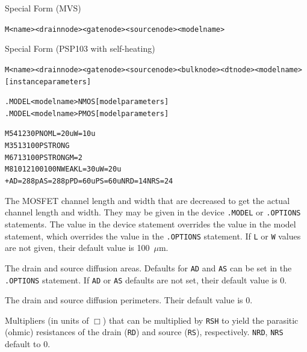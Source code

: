 \begin{Device}
\item[Special Form (MVS)]
\begin{alltt}
M<name> <drain node> <gate node> <source node> <model name>
\end{alltt}

\item[Special Form (PSP103 with self-heating)]
\begin{alltt}
M<name> <drain node> <gate node> <source node> <bulk node> <dt node> <model name> [instance parameters]
\end{alltt}

\model
\begin{alltt}
.MODEL <model name> NMOS [model parameters]
.MODEL <model name> PMOS [model parameters]
\end{alltt}

\examples
\begin{alltt}
M5 4 12 3 0 PNOM L=20u W=10u
M3 5 13 10 0 PSTRONG
M6 7 13 10 0 PSTRONG M=2
M8 10 12 100 100 NWEAK L=30u W=20u
+ AD=288p AS=288p PD=60u PS=60u NRD=14 NRS=24
\end{alltt}

\parameters

\begin{Parameters}


The MOSFET channel length and width that are decreased to get the actual
channel length and width. They may be given in the device
\texttt{.MODEL} or \texttt{.OPTIONS} statements. The value in the device
statement overrides the value in the model statement, which overrides
the value in the \texttt{.OPTIONS} statement. If \texttt{L} or \texttt{W}
values are not given, their default value is 100~$\mu$m.


The drain and source diffusion areas. Defaults for \texttt{AD} and
\texttt{AS} can be set in the \texttt{.OPTIONS} statement.  If
\texttt{AD} or \texttt{AS} defaults are not set, their default value is
0.

The drain and source diffusion perimeters. Their default value is 0.


Multipliers (in units of $\Box$) that can be multiplied by \texttt{RSH}
to yield the parasitic (ohmic) resistances of the drain (\texttt{RD})
and source (\texttt{RS}), respectively.  \texttt{NRD}, \texttt{NRS}
default to 0.


\end{Parameters}
\end{Device}
